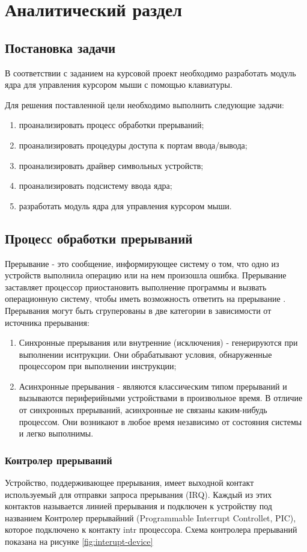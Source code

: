 \section{Аналитический раздел}
\subsection{Постановка задачи}
В соответствии с заданием на курсовой проект необходимо разработать модуль ядра для управления курсором мыши с помощью клавиатуры.

Для решения поставленной цели необходимо выполнить следующие задачи:
\begin{enumerate}
	\item проанализировать процесс обработки прерываний;
	\item проанализировать процедуры доступа к портам ввода/вывода;
	\item проанализировать драйвер символьных устройств;
	\item проанализировать подсистему ввода ядра;
	\item разработать модуль ядра для управления курсором мыши.
\end{enumerate}

\subsection{Процесс обработки прерываний}
Прерывание - это сообщение, информирующее систему о том, что одно из устройств выполнила операцию или на нем произошла ошибка. 
Прерывание заставляет процессор приостановить выполнение программы и вызвать операционную систему, чтобы иметь возможность ответить на прерывание \cite{3}.
Прерывания могут быть сгруперованы в две категории в зависимости от источника прерывания:
\begin{enumerate}
	\item Синхронные прерывания или внутренние (исключения) - генерируются при выполнении иснтрукции.
	Они обрабатывают условия, обнаруженные процессором при выполнении инструкции;
	\item Асинхронные прерывания - являются классическим типом прерываний и вызываются периферийными устройствами в произвольное время. 
	В отличие от синхронных прерываний, асинхронные не связаны каким-нибудь процессом. 
	Они возникают в любое время независимо от состояния системы и легко выполнимы.
\end{enumerate}

\subsubsection{Контролер прерываний}
Устройство, поддерживающее прерывания, имеет выходной контакт используемый для отправки запроса прерывания (IRQ). 
Каждый из этих контактов называется линией прерывания и подключен к устройству под названием Контролер прерывайний (Programmable Interrupt Controllet, PIC), которое подключено к контакту intr процессора. Схема контролера прерываний показана на рисунке \ref{fig:interupt-device}

